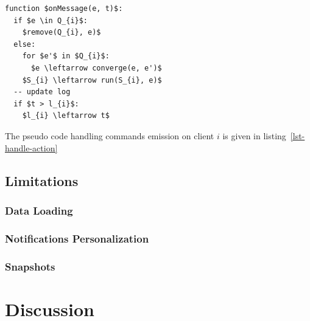 \documentclass{acm_proc_article-sp}
\begin{document}
\begin{lstlisting}[mathescape]
function $onMessage(e, t)$:
  if $e \in Q_{i}$:
    $remove(Q_{i}, e)$
  else:
    for $e'$ in $Q_{i}$:
      $e \leftarrow converge(e, e')$
    $S_{i} \leftarrow run(S_{i}, e)$
  -- update log
  if $t > l_{i}$:
    $l_{i} \leftarrow t$
\end{lstlisting}

The pseudo code handling commands emission on client $i$ is given in listing~\ref{lst-handle-action}


\subsection{Limitations}

\subsubsection{Data Loading}

\subsubsection{Notifications Personalization}

\subsubsection{Snapshots}

\section{Discussion}

\balancecolumns
\end{document}
